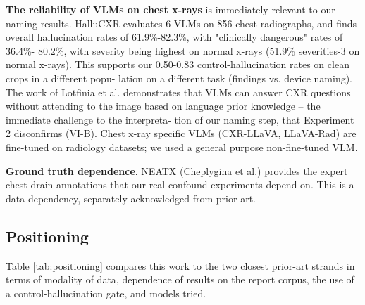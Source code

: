 \documentclass{ieeeaccess}
\begin{document}
\textbf{The reliability of VLMs on chest x-rays} is immediately
relevant to our naming results. HalluCXR evaluates 6 VLMs on
856 chest radiographs, and finds overall hallucination rates
of 61.9\%-82.3\%, with "clinically dangerous" rates of 36.4\%-
80.2\%, with severity being highest on normal x-rays (51.9\%
severities-3 on normal x-rays). This supports our 0.50-0.83
control-hallucination rates on clean crops in a different popu-
lation on a different task (findings vs. device naming). The work
of Lotfinia et al. demonstrates that VLMs can answer CXR
questions without attending to the image based on language
prior knowledge – the immediate challenge to the interpreta-
tion of our naming step, that Experiment 2 disconfirms (VI-B).
Chest x-ray specific VLMs (CXR-LLaVA, LLaVA-Rad)
are fine-tuned on radiology datasets; we used a general purpose non-fine-tuned VLM.

\textbf{Ground truth dependence}. NEATX (Cheplygina et al.)
provides the expert chest drain annotations that our real
confound experiments depend on. This is a data dependency,
separately acknowledged from prior art.

\subsection{Positioning}
Table \ref{tab:positioning} compares this work to the two closest
prior-art strands in terms of modality of data,
dependence of results on the report corpus, the use of a
control-hallucination gate, and models tried.
\end{document}
